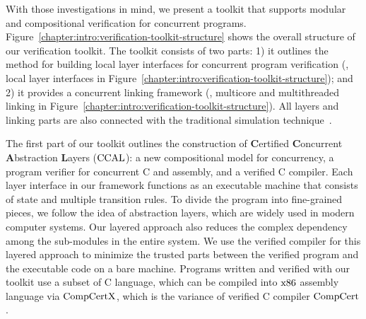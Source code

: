 With those investigations in mind, 
we present a toolkit that supports modular and compositional verification for concurrent programs.
Figure~\ref{chapter:intro:verification-toolkit-structure}  shows the overall structure of our verification toolkit. 
The toolkit consists of two parts: 
1) it outlines the method for building local layer interfaces for concurrent program verification (\ie, local layer interfaces in Figure~\ref{chapter:intro:verification-toolkit-structure}); 
and 2) it provides a concurrent linking framework (\ie, multicore and multithreaded linking in Figure~\ref{chapter:intro:verification-toolkit-structure}). 
All layers and linking parts are also connected with the traditional simulation technique~\cite{compcert, deepspec}. 

 
The first part of our toolkit outlines the construction of \textbf{C}ertified \textbf{C}oncurrent \textbf{A}bstraction \textbf{L}ayers ($\mathrm{CCAL}$): a new compositional model for concurrency, 
a program verifier for concurrent C and assembly, and a verified C compiler. 
Each layer interface in our framework functions as an executable machine that consists of state and multiple transition rules. 
To divide the program into fine-grained pieces, we follow the idea of abstraction layers, which are widely used in modern computer systems. 
Our layered approach also reduces the complex dependency among the sub-modules in the entire system. 
We use the verified compiler for this layered approach to minimize the trusted parts between the verified program and the executable code on a bare machine. 
Programs written and verified with our toolkit use a subset of C language, which can be compiled into $\mathrm{x86}$ assembly language via $\mathrm{CompCertX}$, which is the variance of verified C compiler $\mathrm{CompCert}$.  

